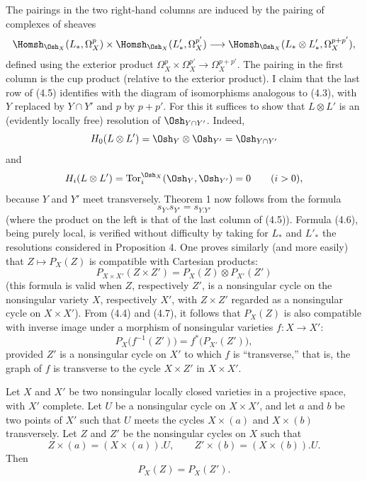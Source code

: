 The pairings in the two right-hand columns are induced by the pairing of
complexes of sheaves
\[
\Homsh_{\Osh_X}(L_{*},\Omega_X^{p})
\times\Homsh_{\Osh_X}(L'_{*},\Omega_X^{p'})
\longrightarrow
\Homsh_{\Osh_X}(L_{*}\otimes L'_{*},\Omega_X^{p+p'}),
\]
defined using the exterior product
$\Omega_X^{p}\times\Omega_X^{p'}\longrightarrow\Omega_X^{p+p'}$.
The pairing in the first column is the cup product (relative to the exterior
product). I claim that the last row of (4.5) identifies with the diagram of
isomorphisms analogous to (4.3), with $Y$ replaced by $Y\cap Y'$ and $p$ by
$p+p'$. For this it suffices to show that $L\otimes L'$ is an (evidently locally
free) resolution of $\Osh_{Y\cap Y'}$. Indeed,
\[
  H_0(L\otimes L')=\Osh_Y\otimes\Osh_{Y'}=\Osh_{Y\cap Y'}
\]
and
\[
  H_i(L\otimes L')=\operatorname{Tor}_{i}^{\Osh_X}(\Osh_Y,\Osh_{Y'})=0
  \qquad(i>0),
\]
because $Y$ and $Y'$ meet transversely. Theorem 1 now follows from the formula
\begin{equation}\tag{4.6}
  s_Y.s_{Y'}=s_{Y.Y'}
\end{equation}
(where the product on the left is that of the last column of (4.5)). Formula
(4.6), being purely local, is verified without difficulty by taking for $L_{*}$
and $L'_{*}$ the resolutions considered in Proposition 4. One proves similarly
(and more easily) that $Z\longmapsto P_X(Z)$ is compatible with Cartesian
products:
\begin{equation}\tag{4.7}
  P_{X\times X'}(Z\times Z')=P_X(Z)\otimes P_{X'}(Z')
\end{equation}
(this formula is valid when $Z$, respectively $Z'$, is a nonsingular cycle on
the nonsingular variety $X$, respectively $X'$, with $Z\times Z'$ regarded as a
nonsingular cycle on $X\times X'$). From (4.4) and (4.7), it follows that
$P_X(Z)$ is also compatible with inverse image under a morphism of nonsingular
varieties $f:X\longrightarrow X'$:
\begin{equation}\tag{4.8}
  P_X\bigl(f^{-1}(Z')\bigr)=f^{*}\bigl(P_{X'}(Z')\bigr),
\end{equation}
provided $Z'$ is a nonsingular cycle on $X'$ to which $f$ is “transverse,” that
is, the graph of $f$ is transverse to the cycle $X\times Z'$ in $X\times X'$.

 Let $X$ and $X'$ be two nonsingular locally closed
varieties in a projective space, with $X'$ complete. Let $U$ be a nonsingular
cycle on $X\times X'$, and let $a$ and $b$ be two points of $X'$ such that $U$
meets the cycles $X\times(a)$ and $X\times(b)$ transversely. Let $Z$ and $Z'$ be
the nonsingular cycles on $X$ such that
\[
  Z\times(a)=(X\times(a)).U,
  \qquad
  Z'\times(b)=(X\times(b)).U.
\]
Then
\[
  P_X(Z)=P_X(Z').
\]

